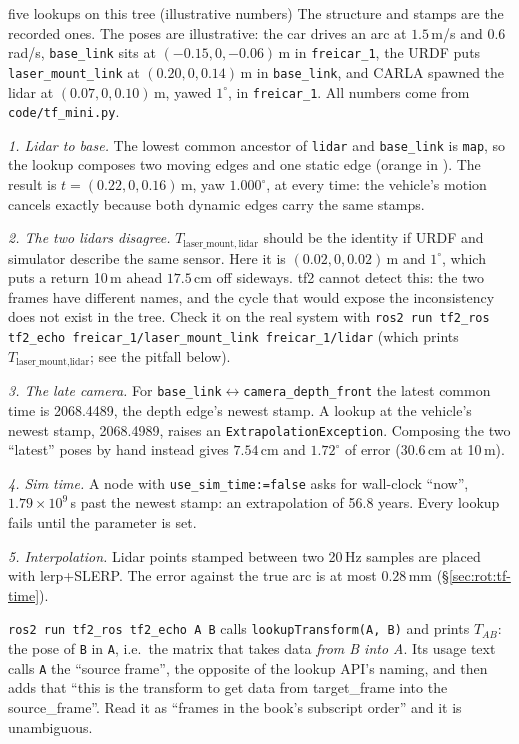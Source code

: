 \begin{example}{five lookups on this tree (illustrative numbers)}
The structure and stamps are the recorded ones. The poses are illustrative: the car drives an arc at $1.5$\,m/s and $0.6$\,rad/s, \texttt{base\_link} sits at $(-0.15,0,-0.06)$\,m in \texttt{freicar\_1}, the URDF puts \texttt{laser\_mount\_link} at $(0.20,0,0.14)$\,m in \texttt{base\_link}, and CARLA spawned the lidar at $(0.07,0,0.10)$\,m, yawed $1^\circ$, in \texttt{freicar\_1}. All numbers come from \texttt{code/tf\_mini.py}.

\emph{1. Lidar to base.} The lowest common ancestor of \texttt{lidar} and \texttt{base\_link} is \texttt{map}, so the lookup composes two moving edges and one static edge (orange in ). The result is $t=(0.22,0,0.16)$\,m, yaw $1.000^\circ$, at every time: the vehicle's motion cancels exactly because both dynamic edges carry the same stamps.

\emph{2. The two lidars disagree.} $T_{\text{laser\_mount},\,\text{lidar}}$ should be the identity if URDF and simulator describe the same sensor. Here it is $(0.02,0,0.02)$\,m and $1^\circ$, which puts a return 10\,m ahead $17.5$\,cm off sideways. tf2 cannot detect this: the two frames have different names, and the cycle that would expose the inconsistency does not exist in the tree. Check it on the real system with \texttt{ros2 run tf2\_ros tf2\_echo freicar\_1/laser\_mount\_link freicar\_1/lidar} (which prints $T_{\text{laser\_mount},\text{lidar}}$; see the pitfall below).

\emph{3. The late camera.} For \texttt{base\_link}$\leftrightarrow$\texttt{camera\_depth\_front} the latest common time is 2068.4489, the depth edge's newest stamp. A lookup at the vehicle's newest stamp, 2068.4989, raises an \texttt{ExtrapolationException}. Composing the two ``latest'' poses by hand instead gives $7.54$\,cm and $1.72^\circ$ of error ($30.6$\,cm at 10\,m).

\emph{4. Sim time.} A node with \texttt{use\_sim\_time:=false} asks for wall-clock ``now'', $1.79\times10^9$\,s past the newest stamp: an extrapolation of 56.8 years. Every lookup fails until the parameter is set.

\emph{5. Interpolation.} Lidar points stamped between two 20\,Hz samples are placed with lerp+SLERP. The error against the true arc is at most $0.28$\,mm (\S\ref{sec:rot:tf-time}).
\end{example}

\begin{pitfall}
\texttt{ros2 run tf2\_ros tf2\_echo A B} calls \texttt{lookupTransform(A, B)} and prints $T_{AB}$: the pose of \texttt{B} in \texttt{A}, i.e.\ the matrix that takes data \emph{from B into A}. Its usage text calls \texttt{A} the ``source frame'', the opposite of the lookup API's naming, and then adds that ``this is the transform to get data from target\_frame into the source\_frame''. Read it as ``frames in the book's subscript order'' and it is unambiguous.
\end{pitfall}

